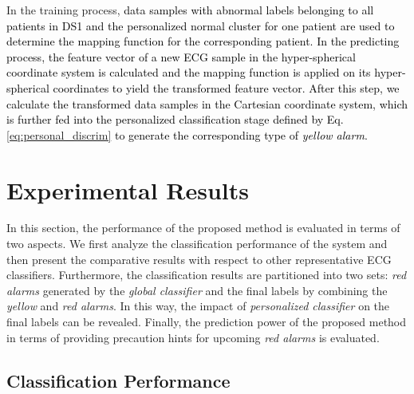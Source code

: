 In the training process, \textcolor{black}{data samples with abnormal labels belonging to all patients in DS1 and the personalized normal cluster for one patient are used to determine the mapping function for the corresponding patient. In the predicting process, the feature vector of a new ECG sample in the hyper-spherical coordinate system is calculated and the mapping function is applied on its hyper-spherical coordinates to yield the transformed feature vector. After this step, we calculate the transformed data samples in the Cartesian coordinate system, which is further fed into the personalized classification stage defined by Eq. \ref{eq:personal_discrim} to generate the corresponding type of \textit{yellow alarm}.} %



\section{Experimental Results}\label{sec:result_spatial}

In this section, the performance of the proposed method is evaluated in terms of two aspects. We first analyze the classification performance of the system and then present the comparative results with respect to other representative ECG classifiers. Furthermore, the classification results are partitioned into two sets: \textit{red alarms} generated by the \textit{global classifier} and the final labels by combining the \textit{yellow} and \textit{red alarms}. In this way, the impact of \textit{personalized classifier} on the final labels can be revealed. Finally, the prediction power of the proposed method in terms of providing precaution hints for upcoming \textit{red alarms} is evaluated.

\subsection{Classification Performance}

